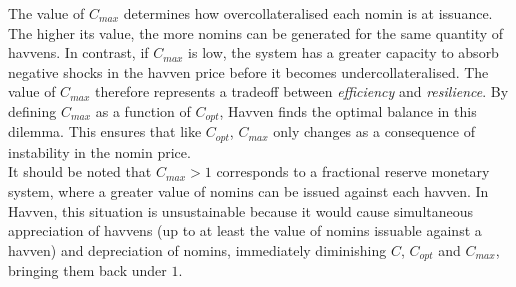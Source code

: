 \noindent The value of \(C_{max}\) determines how overcollateralised each nomin
is at issuance. The higher its value, the more nomins can be generated for
the same quantity of havvens. In contrast, if \(C_{max}\) is low, the system
has a greater capacity to absorb negative shocks in the havven price before
it becomes undercollateralised. The value of \(C_{max}\) therefore represents a
tradeoff between \textit{efficiency} and \textit{resilience}. By defining
\(C_{max}\) as a function of \(C_{opt}\), Havven finds the optimal balance in
this dilemma. This ensures that like \(C_{opt}\), \(C_{max}\) only changes as a
consequence of instability in the nomin price. \\

\noindent It should be noted that \(C_{max} > 1\) corresponds to a fractional
reserve monetary system, where a greater value of nomins can be issued
against each havven. In Havven, this situation is unsustainable because it
would cause simultaneous appreciation of havvens (up to at least the value of
nomins issuable against a havven) and depreciation of nomins, immediately
diminishing \(C\), \(C_{opt}\) and \(C_{max}\), bringing them back under \(1\).

